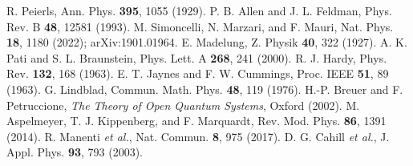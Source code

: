 \documentclass[aps,prb,preprint,amsmath,amssymb]{revtex4-2} %
\begin{document}
\begin{thebibliography}{99}
 R. Peierls, Ann. Phys. \textbf{395}, 1055 (1929).
 P. B. Allen and J. L. Feldman, Phys. Rev. B \textbf{48}, 12581 (1993).
 M. Simoncelli, N. Marzari, and F. Mauri, Nat. Phys. \textbf{18}, 1180 (2022); arXiv:1901.01964.
 E. Madelung, Z. Physik \textbf{40}, 322 (1927).
 A. K. Pati and S. L. Braunstein, Phys. Lett. A \textbf{268}, 241 (2000).
 R. J. Hardy, Phys. Rev. \textbf{132}, 168 (1963).
 E. T. Jaynes and F. W. Cummings, Proc. IEEE \textbf{51}, 89 (1963).
 G. Lindblad, Commun. Math. Phys. \textbf{48}, 119 (1976).
 H.-P. Breuer and F. Petruccione, \textit{The Theory of Open Quantum Systems}, Oxford (2002).
 M. Aspelmeyer, T. J. Kippenberg, and F. Marquardt, Rev. Mod. Phys. \textbf{86}, 1391 (2014).
 R. Manenti \textit{et al.}, Nat. Commun. \textbf{8}, 975 (2017).
 D. G. Cahill \textit{et al.}, J. Appl. Phys. \textbf{93}, 793 (2003).
\end{thebibliography}
\end{document}
